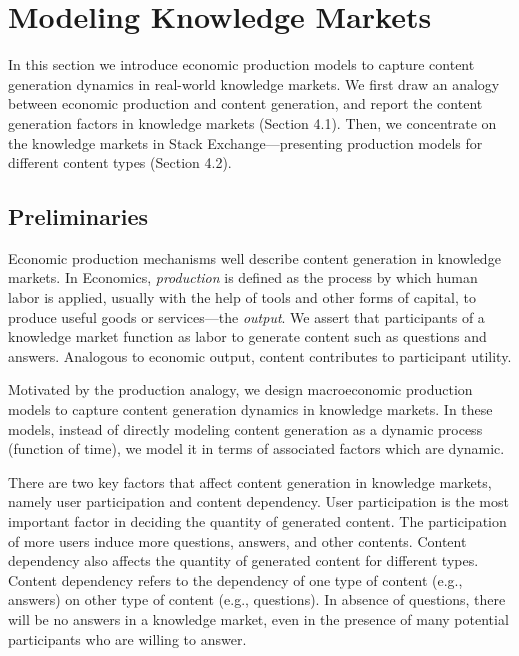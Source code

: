 \section{Modeling Knowledge Markets}
In this section we introduce economic production models to capture content generation dynamics in real-world knowledge markets. We first draw an analogy between economic production and content generation, and report the content generation factors in knowledge markets (Section 4.1). Then, we concentrate on the knowledge markets in Stack Exchange---presenting production models for different content types (Section 4.2).

\subsection{Preliminaries} 
Economic production mechanisms well describe content generation in knowledge markets. In Economics, \emph{production} is defined as the process by which human labor is applied, usually with the help of tools and other forms of capital, to produce useful goods or services---the \emph{output}. We assert that participants of a knowledge market function as labor to generate content such as questions and answers. Analogous to economic output, content contributes to participant utility. 

Motivated by the production analogy, we design macroeconomic production models to capture content generation dynamics in knowledge markets. In these models, instead of directly modeling content generation as a dynamic process (function of time), we model it in terms of associated factors which are dynamic. 

There are two key factors that affect content generation in knowledge markets, namely user participation and content dependency. User participation is the most important factor in deciding the quantity of generated content. The participation of more users induce more questions, answers, and other contents. Content dependency also affects the quantity of generated content for different types. Content dependency refers to the dependency of one type of content (e.g., answers) on other type of content (e.g., questions). In absence of questions, there will be no answers in a knowledge market, even in the presence of many potential participants who are willing to answer. 


